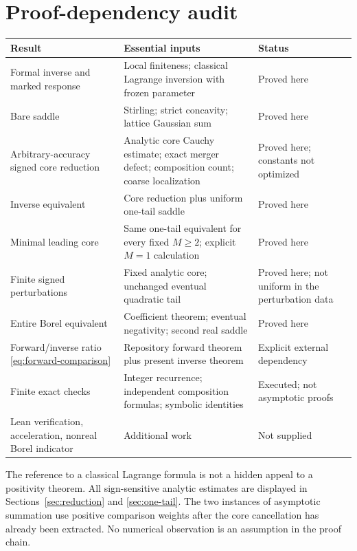 \documentclass[11pt,a4paper]{article}
\numberwithin{equation}{section}
\theoremstyle{definition}
\theoremstyle{remark}\newtheorem{remark}[theorem]{Remark}
\begin{document}
\section{Proof-dependency audit}
\label{app:audit}
\begin{longtable}{>{\raggedright\arraybackslash}p{}>{\raggedright\arraybackslash}p{}>{\raggedright\arraybackslash}p{}}
\toprule Result & Essential inputs & Status\\\midrule\endhead
Formal inverse and marked response & Local finiteness; classical Lagrange inversion with frozen parameter & Proved here\\[5pt]
Bare saddle & Stirling; strict concavity; lattice Gaussian sum & Proved here\\[5pt]
Arbitrary-accuracy signed core reduction & Analytic core Cauchy estimate; exact merger defect; composition count; coarse localization & Proved here; constants not optimized\\[5pt]
Inverse equivalent & Core reduction plus uniform one-tail saddle & Proved here\\[5pt]
Minimal leading core & Same one-tail equivalent for every fixed $M\ge2$; explicit $M=1$ calculation & Proved here\\[5pt]
Finite signed perturbations & Fixed analytic core; unchanged eventual quadratic tail & Proved here; not uniform in the perturbation data\\[5pt]
Entire Borel equivalent & Coefficient theorem; eventual negativity; second real saddle & Proved here\\[5pt]
Forward/inverse ratio \eqref{eq:forward-comparison} & Repository forward theorem plus present inverse theorem & Explicit external dependency\\[5pt]
Finite exact checks & Integer recurrence; independent composition formulas; symbolic identities & Executed; not asymptotic proofs\\[5pt]
Lean verification, acceleration, nonreal Borel indicator & Additional work & Not supplied\\\bottomrule
\end{longtable}

The reference to a classical Lagrange formula is not a hidden appeal to a
positivity theorem. All sign-sensitive analytic estimates are displayed in
Sections~\ref{sec:reduction} and \ref{sec:one-tail}. The two instances of
asymptotic summation use positive comparison weights after the core
cancellation has already been extracted. No numerical observation is an
assumption in the proof chain.
\end{document}
